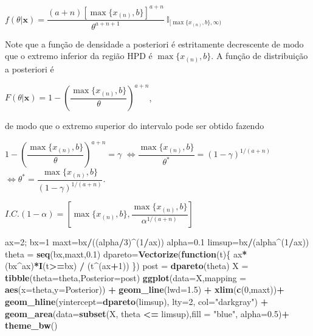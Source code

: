 \documentclass[
]{book}
\newenvironment{Shaded}{\begin{snugshade}}{\end{snugshade}}
\newcommand{\ControlFlowTok}[1]{\textcolor[rgb]{0.13,0.29,0.53}{\textbf{#1}}}
\newcommand{\DataTypeTok}[1]{\textcolor[rgb]{0.13,0.29,0.53}{#1}}
\newcommand{\DecValTok}[1]{\textcolor[rgb]{0.00,0.00,0.81}{#1}}
\newcommand{\FloatTok}[1]{\textcolor[rgb]{0.00,0.00,0.81}{#1}}
\newcommand{\KeywordTok}[1]{\textcolor[rgb]{0.13,0.29,0.53}{\textbf{#1}}}
\newcommand{\NormalTok}[1]{#1}
\newcommand{\OperatorTok}[1]{\textcolor[rgb]{0.81,0.36,0.00}{\textbf{#1}}}
\newcommand{\StringTok}[1]{\textcolor[rgb]{0.31,0.60,0.02}{#1}}
\begin{document}
\(f(\theta|\boldsymbol x) =\dfrac{(a+n)[\max\{x_{(n)},b\}]^{a+n}}{\theta^{a+n+1}}~\mathbb I_{[\max\{x_{(n)},b\},\infty)}\)

Note que a função de densidade a posteriori é estritamente decrescente de modo que o extremo inferior da região HPD é \(\max\{x_{(n)},b\}\). A função de distribuição a posteriori é

\(F(\theta|\boldsymbol x)=1-\left(\dfrac{\max\{x_{(n)},b\}}{\theta}\right)^{a+n}\),

de modo que o extremo superior do intervalo pode ser obtido fazendo

\(1-\left(\dfrac{\max\{x_{(n)},b\}}{\theta}\right)^{a+n}=\gamma\) \(\Leftrightarrow\dfrac{\max\{x_{(n)},b\}}{\theta^*}=(1-\gamma)^{1/(a+n)}\) \(\Leftrightarrow \theta^*=\dfrac{\max\{x_{(n)},b\}}{(1-\gamma)^{1/(a+n)}}\).

\(I.C.(1-\alpha)=\left[\max\{x_{(n)},b\},\dfrac{\max\{x_{(n)},b\}}{\alpha^{1/(a+n)}}\right]\)

\begin{Shaded}
\begin{Highlighting}[]
\NormalTok{ax=}\DecValTok{2}\NormalTok{; bx=}\DecValTok{1}
\NormalTok{maxt=bx}\OperatorTok{/}\NormalTok{((alpha}\OperatorTok{/}\DecValTok{3}\NormalTok{)}\OperatorTok{^}\NormalTok{(}\DecValTok{1}\OperatorTok{/}\NormalTok{ax))}
\NormalTok{alpha=}\FloatTok{0.1}
\NormalTok{limsup=bx}\OperatorTok{/}\NormalTok{(alpha}\OperatorTok{^}\NormalTok{(}\DecValTok{1}\OperatorTok{/}\NormalTok{ax))}
\NormalTok{theta =}\StringTok{ }\KeywordTok{seq}\NormalTok{(bx,maxt,}\FloatTok{0.1}\NormalTok{)}
\NormalTok{dpareto=}\KeywordTok{Vectorize}\NormalTok{(}\ControlFlowTok{function}\NormalTok{(t)\{}
\NormalTok{  ax}\OperatorTok{*}\NormalTok{(bx}\OperatorTok{^}\NormalTok{ax)}\OperatorTok{*}\KeywordTok{I}\NormalTok{(t}\OperatorTok{>=}\NormalTok{bx) }\OperatorTok{/}\StringTok{ }\NormalTok{(t}\OperatorTok{^}\NormalTok{(ax}\OperatorTok{+}\DecValTok{1}\NormalTok{)) \})}
\NormalTok{post =}\StringTok{ }\KeywordTok{dpareto}\NormalTok{(theta)}
\NormalTok{X =}\StringTok{ }\KeywordTok{tibble}\NormalTok{(}\DataTypeTok{theta=}\NormalTok{theta,}\DataTypeTok{Posterior=}\NormalTok{post)}
\KeywordTok{ggplot}\NormalTok{(}\DataTypeTok{data=}\NormalTok{X,}\DataTypeTok{mapping =} \KeywordTok{aes}\NormalTok{(}\DataTypeTok{x=}\NormalTok{theta,}\DataTypeTok{y=}\NormalTok{Posterior)) }\OperatorTok{+}
\StringTok{  }\KeywordTok{geom_line}\NormalTok{(}\DataTypeTok{lwd=}\FloatTok{1.5}\NormalTok{) }\OperatorTok{+}
\StringTok{  }\KeywordTok{xlim}\NormalTok{(}\KeywordTok{c}\NormalTok{(}\DecValTok{0}\NormalTok{,maxt))}\OperatorTok{+}
\StringTok{  }\KeywordTok{geom_hline}\NormalTok{(}\DataTypeTok{yintercept=}\KeywordTok{dpareto}\NormalTok{(limsup), }\DataTypeTok{lty=}\DecValTok{2}\NormalTok{, }\DataTypeTok{col=}\StringTok{"darkgray"}\NormalTok{) }\OperatorTok{+}
\StringTok{  }\KeywordTok{geom_area}\NormalTok{(}\DataTypeTok{data=}\KeywordTok{subset}\NormalTok{(X, theta }\OperatorTok{<=}\StringTok{ }\NormalTok{limsup),}\DataTypeTok{fill =} \StringTok{"blue"}\NormalTok{, }\DataTypeTok{alpha=}\FloatTok{0.5}\NormalTok{)}\OperatorTok{+}
\StringTok{  }\KeywordTok{theme_bw}\NormalTok{()}
\end{Highlighting}
\end{Shaded}
\end{document}
